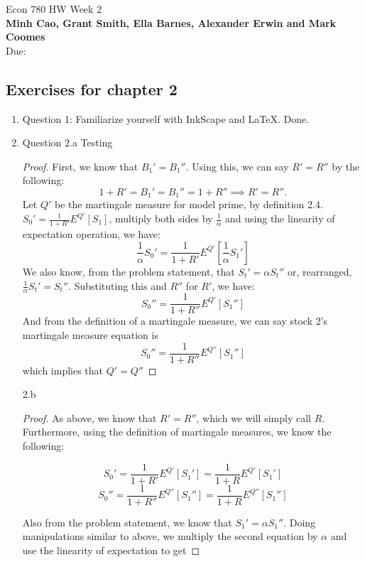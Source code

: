 \documentclass[]{book}
\theoremstyle{definition}
\begin{document}
\begin{center}
{\Large Econ 780 \hspace{0.5cm} HW Week 2}\\
\textbf{Minh Cao, Grant Smith, Ella Barnes, Alexander Erwin and Mark Coomes}\\ %
Due:  %
\end{center}

\vspace{0.2 cm}


\subsection*{Exercises for chapter 2}

\begin{enumerate}
\item Question 1:  Familiarize yourself with InkScape and LaTeX. Done.
\item
Question 2.a
Testing

\begin{proof}
    First, we know that ${B_1}'={B_1}''$. Using this, we can say $R'=R''$ by the following:
    $$1+R'={B_1}'={B_1}''=1+R'' \implies R'=R''.$$
    Let $Q'$ be the martingale measure for model prime, by definition 2.4. ${S_0}'= \frac{1}{1+R'}E^{Q'}[S_1]$, multiply both sides by $\frac{1}{\alpha}$ and using the linearity of expectation operation, we have:\\
    $$\frac{1}{\alpha}{S_0}'= \frac{1}{1+R'}E^{Q'}[\frac{1}{\alpha}{S_1}']$$
    We also know, from the problem statement, that ${S_t}'=\alpha {S_t}''$ or, rearranged, $\frac{1}{\alpha} {S_t}'={S_t}''$. Substituting this and $R''$ for $R'$, we have:
    $${S_0}''= \frac{1}{1+R''}E^{Q'}[{S_1}'']$$
    And from the definition of a martingale measure, we can say stock 2's martingale measure equation is
    $${S_0}''= \frac{1}{1+R''}E^{Q''}[{S_1}'']$$
    which implies that $Q' = Q''$ 
\end{proof}

2.b
\begin{proof}
As above, we know that $R'=R''$, which we will simply call $R$. Furthermore, using the definition of martingale measures, we know the following:

$${S_0}'= \frac{1}{1+R'}E^{Q'}[{S_1}']=\frac{1}{1+R}E^{Q'}[{S_1}']$$
$${S_0}''= \frac{1}{1+R''}E^{Q''}[{S_1}'']= \frac{1}{1+R}E^{Q''}[{S_1}'']$$

Also from the problem statement, we know that ${S_1}' = \alpha{S_1}'' $. Doing manipulations similar to above, we multiply the second equation by $\alpha$ and use the linearity of expectation to get 


\end{proof}
\end{enumerate}
\end{document}
